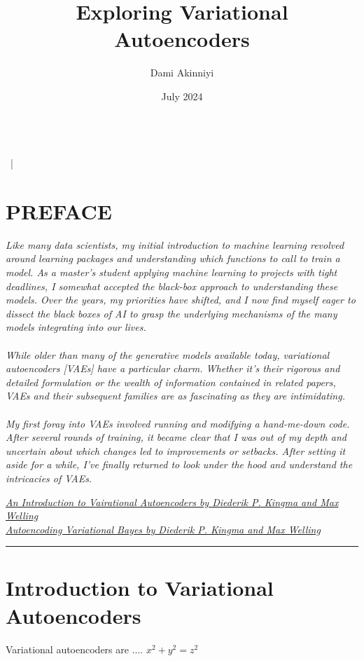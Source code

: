 \documentclass[9pt, a4paper]{article}
\makeatletter
\renewcommand{\maketitle}{\bgroup\setlength{\parindent}{0pt} %
\begin{flushleft}
  \textbf{\@title}\\
  \@author~|~\@date
\end{flushleft}\egroup
}
\makeatother
\begin{document}
\author{Dami Akinniyi}
\title{\Large Exploring Variational Autoencoders}
\date{July 2024}
\maketitle

\setlength{\parindent}{0pt}

\section*{PREFACE}
\indent \textit{Like many data scientists, my initial introduction to machine learning revolved around 
learning packages and understanding which functions to call to train a model. As a master's student 
applying machine learning to projects with tight deadlines, I somewhat accepted the black-box approach 
to understanding these models. Over the years, my priorities have shifted, and I now find myself eager 
to dissect the black boxes of AI to grasp the underlying mechanisms of the many models integrating into our 
lives.\\ \\
While older than many of the generative models available today, variational autoencoders [VAEs] have a 
particular charm. Whether it's their rigorous and detailed formulation or the wealth of information 
contained in related papers, VAEs and their subsequent families are as fascinating as they are 
intimidating. \\ \\
My first foray into VAEs involved running and modifying a hand-me-down code. After several rounds of 
training, it became clear that I was out of my depth and uncertain about which changes led to improvements 
or setbacks. After setting it aside for a while, I've finally returned to look under the hood and 
understand the intricacies of VAEs.\\}

\href{https://arxiv.org/pdf/1906.02691}{\textit{An Introduction to Vairational Autoencoders by Diederik P. Kingma and Max Welling}}\\
\href{https://arxiv.org/pdf/1312.6114}{\textit{Autoencoding Variational Bayes by Diederik P. Kingma and Max Welling}}\\
\rule{\linewidth}{0.5pt}
\section{Introduction to Variational Autoencoders}
Variational autoencoders are .... \(x^2 + y^2 = z^2\)
\end{document}
